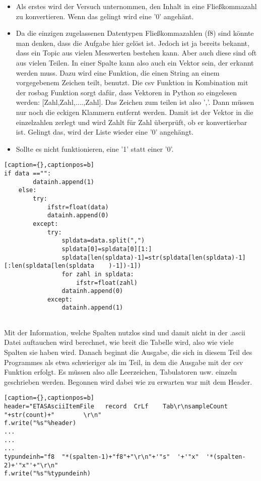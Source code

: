 \documentclass[11pt]{scrartcl}
\begin{document}
\begin{onehalfspace}
 \begin{itemize}

 \item Als erstes wird der Versuch unternommen, den Inhalt in eine Fließkommazahl zu konvertieren. Wenn das gelingt wird eine '0' angehänt.
\item Da die einzigen zugelassenen Datentypen Fließkommazahlen (f8)
 sind könnte man denken, dass die Aufgabe hier gelöst ist. Jedoch ist ja bereits bekannt, dass ein Topic aus vielen Messwerten bestehen kann. Aber auch diese sind oft aus vielen Teilen. In einer Spalte kann also auch ein Vektor sein, der erkannt werden muss. Dazu wird eine Funktion, die einen String an einem vorgegebenem Zeichen teilt, benutzt. Die csv Funktion in Kombination mit der rosbag Funktion sorgt dafür, dass Vektoren in Python so eingelesen werden: [Zahl,Zahl,....,Zahl]. Das Zeichen zum teilen ist also ','. Dann müssen nur noch die eckigen Klammern entfernt werden. Damit ist der Vektor in die einzelzahlen zerlegt und wird Zahlt für Zahl überprüft, ob er konvertierbar ist. Gelingt das, wird der Liste wieder eine '0' angehängt.
 \item Sollte es nicht funktionieren, eine '1' statt einer '0'.
 \end{itemize}

\begin{lstlisting}[basicstyle=\small][caption={},captionpos=b]
if data =="":
		datainh.append(1)
	else:	
		try:
			ifstr=float(data)
			datainh.append(0)
		except:
			try:
				spldata=data.split(",")
				spldata[0]=spldata[0][1:]
				spldata[len(spldata)-1]=str(spldata[len(spldata)-1][:len(spldata[len(spldata	)-1])-1])
				for zahl in spldata:
					ifstr=float(zahl)
				datainh.append(0)
			except:		
				datainh.append(1)
				
\end{lstlisting}

Mit der Information, welche Spalten nutzlos sind und damit nicht in der .ascii Datei auftauchen wird berechnet, wie breit die Tabelle wird, also wie viele Spalten sie haben wird. Danach beginnt die Ausgabe, die sich in diesem Teil des Programmes als etwa schwieriger als im Teil, in dem die Ausgabe mit der csv Funktion erfolgt. Es müssen also alle Leerzeichen, Tabulatoren usw. einzeln geschrieben werden. Begonnen wird dabei wie zu erwarten war mit dem Header.

\begin{lstlisting}[basicstyle=\small][caption={},captionpos=b]
header="ETASAsciiItemFile	record	CrLf	Tab\r\nsampleCount	"+str(count)+"        \r\n"
f.write("%s"%header)
...
...
...
typundeinh="f8	"*(spalten-1)+"f8"+"\r\n"+'"s"	'+'"x"	'*(spalten-2)+'"x"'+"\r\n"
f.write("%s"%typundeinh)


\end{lstlisting}
\end{onehalfspace}
\end{document}
